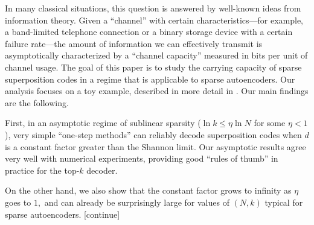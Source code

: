 In many classical situations, this question is answered by well-known ideas from information theory. Given a ``channel'' with certain characteristics---for example, a band-limited telephone connection or a binary storage device with a certain failure rate---the amount of information we can effectively transmit is asymptotically characterized by a ``channel capacity'' measured in bits per unit of channel usage. The goal of this paper is to study the carrying capacity of sparse superposition codes in a regime that is applicable to sparse autoencoders. Our analysis focuses on a toy example, described in more detail in . Our main findings are the following.

First, in an asymptotic regime of sublinear sparsity ($\ln k \le \eta \ln N$ for some $\eta < 1$), very simple ``one-step methods'' can reliably decode superposition codes when $d$ is a constant factor greater than the Shannon limit. Our asymptotic results agree very well with numerical experiments, providing good ``rules of thumb'' in practice for the top-$k$ decoder.

On the other hand, we also show that the constant factor grows to infinity as $\eta$ goes to $1,$ and can already be surprisingly large for values of $(N, k)$ typical for sparse autoencoders. [continue]

